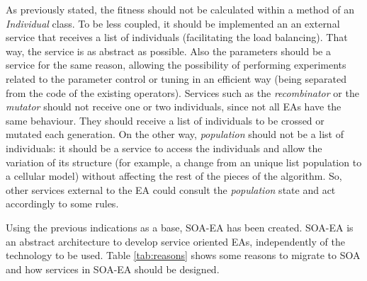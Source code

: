 As previously stated, the 
fitness should not be calculated within a method of an {\em Individual} class. To be less
coupled, it should be implemented an an external service that receives a list of individuals (facilitating the load balancing). That way, the service is as abstract as possible. Also the parameters should be
a service for the same reason, allowing the possibility of performing
experiments related to the parameter control or tuning \cite{ParameterControlEiben07} in an efficient way
(being separated from the code of the existing operators). Services such as the
{\em recombinator} or the {\em mutator} should not receive one or two
individuals, since not all EAs have the same behaviour. They should receive a
list of individuals to be crossed or mutated each generation. On the other way,
{\em population} should not be a list of individuals: it should be a service
to access the individuals and allow the variation of its structure (for example, a change
from an unique list population to a cellular model) without
affecting  the rest of the pieces of the algorithm. So, other services
external to the EA could consult the {\em population} state and act
accordingly to some rules. 

Using the previous indications as a base, SOA-EA has been created. SOA-EA is an
abstract architecture to develop service oriented EAs, independently
of the technology to be used. Table \ref{tab:reasons} shows some reasons to
migrate to SOA and how services in SOA-EA should be designed. 





